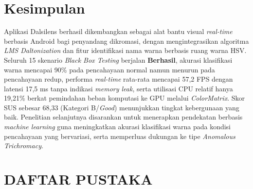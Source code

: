 \section{Kesimpulan}

Aplikasi Dalsilens berhasil dikembangkan sebagai alat bantu visual \textit{real-time} berbasis Android bagi penyandang dikromasi, dengan mengintegrasikan algoritma \textit{LMS Daltonization} dan fitur identifikasi nama warna berbasis ruang warna HSV. Seluruh 15 skenario \textit{Black Box Testing} berjalan \textbf{Berhasil}, akurasi klasifikasi warna mencapai 90\% pada pencahayaan normal namun menurun pada pencahayaan redup, performa \textit{real-time} rata-rata mencapai 57,2 FPS dengan latensi 17,5 ms tanpa indikasi \textit{memory leak}, serta utilisasi CPU relatif hanya 19,21\% berkat pemindahan beban komputasi ke GPU melalui \textit{ColorMatrix}. Skor SUS sebesar 68,33 (Kategori B/\textit{Good}) menunjukkan tingkat kebergunaan yang baik. Penelitian selanjutnya disarankan untuk menerapkan pendekatan berbasis \textit{machine learning} guna meningkatkan akurasi klasifikasi warna pada kondisi pencahayaan yang bervariasi, serta memperluas dukungan ke tipe \textit{Anomalous Trichromacy}.

\section*{\fontsize{11}{13}\selectfont\bfseries DAFTAR PUSTAKA}

